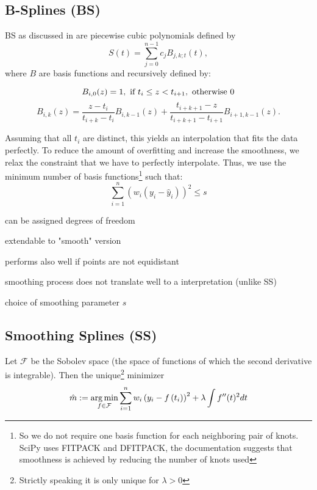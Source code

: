 	\subsection{B-Splines (BS)}
		\label{sec:B}
		BS as discussed in \cite{lycheSplineMethods2005} are piecewise cubic polynomials defined by 
		$$
			S(t)=\sum_{j=0}^{n-1} c_{j} B_{j, k ; t}(t),
		$$
		where $B$ are basis functions and recursively defined by:
		
		\begin{equation}
				B_{i, 0}(z)=1, \text { if } t_{i} \leq z<t_{i+1}, \text { otherwise } 0 \\
		\end{equation}
		\begin{equation}
			B_{i, k}(z)=\frac{z-t_{i}}{t_{i+k}-t_{i}} B_{i, k-1}(z)+\frac{t_{i+k+1}-z}{t_{i+k+1}-t_{i+1}} B_{i+1, k-1}(z).
		\end{equation}
		
		Assuming that all $t_i$ are distinct, this yields an interpolation that fits the data perfectly. To reduce the amount of overfitting and increase the smoothness, we relax the constraint that we have to perfectly interpolate. Thus, we use the minimum number of basis functions\footnote{So we do not require one basis function for each neighboring pair of knots. SciPy uses FITPACK and DFITPACK, the documentation suggests that smoothness is achieved by reducing the number of knots used} such that:
		$$\sum_{i=1}^n(w_i (y_i - \hat y_i))^2 \leq s$$

		\begin{my_pros_cons_table}{
				\item can be assigned degrees of freedom
				\item extendable to "smooth" version
				\item performs also well if points are not equidistant
			}{
				\item smoothing process does not translate well to a interpretation (unlike SS)
				\item choice of smoothing parameter $s$
			}
		\end{my_pros_cons_table}


	\subsection{Smoothing Splines (SS)}
		\label{sec:Natural_SS}
		Let $\mathcal F$ be the Sobolev space (the space of functions of which the second derivative is integrable). Then the unique\footnote{Strictly speaking it is only unique for $\lambda > 0$} minimizer
		\begin{equation}
			\label{eq:ss}
			\hat m :=\operatorname*{arg\, min}_{f \in \mathcal F} \sum_{i=1}^{n}w_i\left(y_{i}-{f}\left(t_{i}\right)\right)^{2}+\lambda \int {f}^{\prime \prime}(t)^{2} dt
		\end{equation}
			
